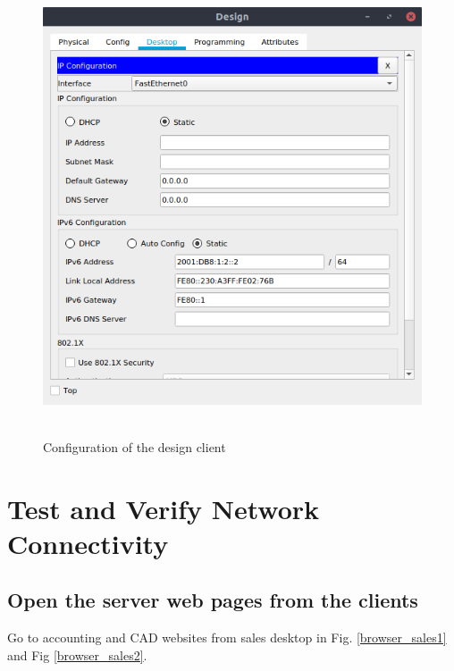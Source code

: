 \documentclass[conference]{IEEEtran}
\begin{document}
\begin{center}
\begin{figure}[h]
\includegraphics[scale=0.45]{resources/q34.png}\
\caption{Configuration of the design client}
\label{client_design}
\end{figure}
\end{center}

\section{Test and Verify Network Connectivity}

\subsection{Open the server web pages from the clients}
Go to accounting and CAD websites from sales desktop in Fig. \ref{browser_sales1} and Fig \ref{browser_sales2}.
\end{document}

